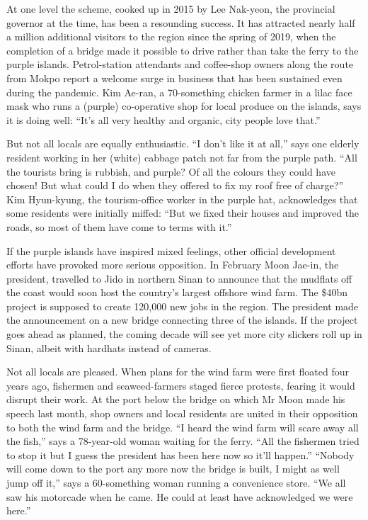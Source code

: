 \documentclass{article}
\begin{document}
At one level the scheme, cooked up in 2015 by Lee Nak-yeon, the provincial governor at the time, has been a resounding success. It has attracted nearly half a million additional visitors to the region since the spring of 2019, when the completion of a bridge made it possible to drive rather than take the ferry to the purple islands. Petrol-station attendants and coffee-shop owners along the route from Mokpo report a welcome surge in business that has been sustained even during the pandemic. Kim Ae-ran, a 70-something chicken farmer in a lilac face mask who runs a (purple) co-operative shop for local produce on the islands, says it is doing well: ``It's all very healthy and organic, city people love that.'' 

But not all locals are equally enthusiastic. ``I don't like it at all,'' says one elderly resident working in her (white) cabbage patch not far from the purple path. ``All the tourists bring is rubbish, and purple? Of all the colours they could have chosen! But what could I do when they offered to fix my roof free of charge?'' Kim Hyun-kyung, the tourism-office worker in the purple hat, acknowledges that some residents were initially miffed: ``But we fixed their houses and improved the roads, so most of them have come to terms with it.'' 

If the purple islands have inspired mixed feelings, other official development efforts have provoked more serious opposition. In February Moon Jae-in, the president, travelled to Jido in northern Sinan to announce that the mudflats off the coast would soon host the country's largest offshore wind farm. The \$40bn project is supposed to create 120,000 new jobs in the region. The president made the announcement on a new bridge connecting three of the islands. If the project goes ahead as planned, the coming decade will see yet more city slickers roll up in Sinan, albeit with hardhats instead of cameras. 

Not all locals are pleased. When plans for the wind farm were first floated four years ago, fishermen and seaweed-farmers staged fierce protests, fearing it would disrupt their work. At the port below the bridge on which Mr Moon made his speech last month, shop owners and local residents are united in their opposition to both the wind farm and the bridge. ``I heard the wind farm will scare away all the fish,'' says a 78-year-old woman waiting for the ferry. ``All the fishermen tried to stop it but I guess the president has been here now so it'll happen.'' ``Nobody will come down to the port any more now the bridge is built, I might as well jump off it,'' says a 60-something woman running a convenience store. ``We all saw his motorcade when he came. He could at least have acknowledged we were here.'' {} 
\clearpage
\end{document}
